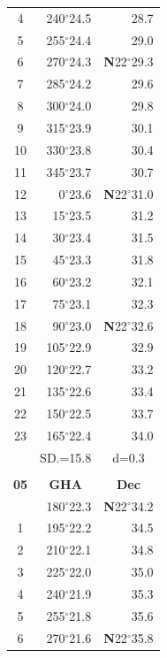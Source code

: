 \documentclass[10pt, a4paper]{report}
\begin{document}
\begin{scriptsize}
\begin{tabular*}{0.2\textwidth}[t]{@{\extracolsep{\fill}}|c|rr|}
4 & 240$^\circ$24.5 & 28.7\\
5 & 255$^\circ$24.4 & 29.0\\[2Pt]
6 & 270$^\circ$24.3 & \textbf{N}22$^\circ$29.3\\
7 & 285$^\circ$24.2 & 29.6\\
8 & 300$^\circ$24.0 & 29.8\\
9 & 315$^\circ$23.9 & \raisebox{0.24ex}{\boldmath$\cdot$~\boldmath$\cdot$~~}30.1\\
10 & 330$^\circ$23.8 & 30.4\\
11 & 345$^\circ$23.7 & 30.7\\[2Pt]
12 & 0$^\circ$23.6 & \textbf{N}22$^\circ$31.0\\
13 & 15$^\circ$23.5 & 31.2\\
14 & 30$^\circ$23.4 & 31.5\\
15 & 45$^\circ$23.3 & \raisebox{0.24ex}{\boldmath$\cdot$~\boldmath$\cdot$~~}31.8\\
16 & 60$^\circ$23.2 & 32.1\\
17 & 75$^\circ$23.1 & 32.3\\[2Pt]
18 & 90$^\circ$23.0 & \textbf{N}22$^\circ$32.6\\
19 & 105$^\circ$22.9 & 32.9\\
20 & 120$^\circ$22.7 & 33.2\\
21 & 135$^\circ$22.6 & \raisebox{0.24ex}{\boldmath$\cdot$~\boldmath$\cdot$~~}33.4\\
22 & 150$^\circ$22.5 & 33.7\\
23 & 165$^\circ$22.4 & 34.0\\
\hline
\rule{0pt}{2.4ex} & \multicolumn{1}{c}{SD.=15.8} & \multicolumn{1}{c|}{d=0.3}\\
\hline
\multicolumn{1}{c}{}\\[-0.5ex]\hline
\multicolumn{1}{|c|}{\rule{0pt}{2.6ex}\textbf{05}} & \multicolumn{1}{c}{\textbf{GHA}} & \multicolumn{1}{c|}{\textbf{Dec}}\\
\hline\rule{0pt}{2.6ex}\noindent
0 & 180$^\circ$22.3 & \textbf{N}22$^\circ$34.2\\
1 & 195$^\circ$22.2 & 34.5\\
2 & 210$^\circ$22.1 & 34.8\\
3 & 225$^\circ$22.0 & \raisebox{0.24ex}{\boldmath$\cdot$~\boldmath$\cdot$~~}35.0\\
4 & 240$^\circ$21.9 & 35.3\\
5 & 255$^\circ$21.8 & 35.6\\[2Pt]
6 & 270$^\circ$21.6 & \textbf{N}22$^\circ$35.8\\

\end{tabular*}
\end{scriptsize}
\end{document}
